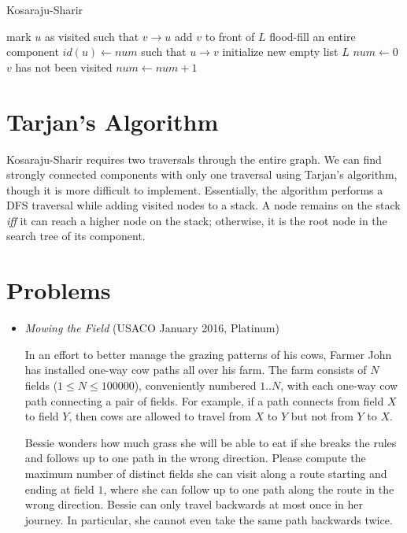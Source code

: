 \documentclass{article}
\begin{document}
\begin{algorithm}[H]
\caption{Kosaraju-Sharir}
\begin{algorithmic}
		\State mark $u$ as visited
	     \Comment such that $v \rightarrow u$
			\State {}
		\EndFor
		\State add $v$ to front of $L$
	\EndIf
\EndFunction
{}  \Comment flood-fill an entire component
    \State $id(u) \gets num$
     \Comment such that $u \rightarrow v$
        \State {}
    \EndFor
\EndFunction
{}
	\State initialize new empty list $L$
		\State {}
	\EndFor
	\State $num \gets 0$
	     \Comment $v$ has not been visited
	        \State $num \gets num + 1$
	        \State {}
	    \EndIf
	\EndFor
\EndFunction
\end{algorithmic}
\end{algorithm}

\section{Tarjan's Algorithm}

Kosaraju-Sharir requires two traversals through the entire graph. We can find strongly connected components with only one traversal using Tarjan's algorithm, though it is more difficult to implement. Essentially, the algorithm performs a DFS traversal while adding visited nodes to a stack. A node remains on the stack \textit{iff} it can reach a higher node on the stack; otherwise, it is the root node in the search tree of its component.


\section{Problems}

\begin{itemize}[leftmargin=0pt]
\item[\label={}]
\textit{Mowing the Field} (USACO January 2016, Platinum)

In an effort to better manage the grazing patterns of his cows, Farmer
John has installed one-way cow paths all over his farm.  The farm
consists of $N$ fields ($1 \le N \le 100000$), conveniently numbered $1..N$, with each one-way
cow path connecting a pair of fields. For example, if a path connects
from field $X$ to field $Y$, then cows are allowed to travel from $X$ to $Y$
but not from $Y$ to $X$.

Bessie wonders how much grass she will be able to eat if she
breaks the rules and follows up to one path in the wrong direction.
Please compute the maximum number of distinct fields she can visit
along a route starting and ending at field $1$, where she can follow up
to one path along the route in the wrong direction.  Bessie can only
travel backwards at most once in her journey.  In particular, she
cannot even take the same path backwards twice.

\end{itemize}
\end{document}

